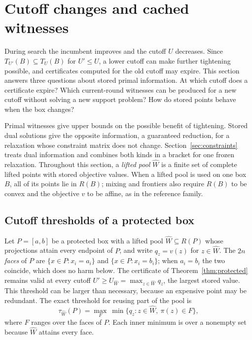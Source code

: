 \section{Cutoff changes and cached witnesses}\label{sec:cutoff}

During search the incumbent improves and the cutoff $U$ decreases. Since
$T_{U'}(B)\subseteq T_U(B)$ for $U'\le U$, a lower cutoff can make
further tightening possible, and certificates computed for the old cutoff
may expire. This section answers three questions about stored primal
information. At which cutoff does a certificate expire? Which
current-round witnesses can be produced for a new cutoff without solving
a new support problem? How do stored points behave when the box changes?

Primal witnesses give upper bounds on the possible benefit of tightening.
Stored dual solutions give the opposite information, a guaranteed
reduction, for a relaxation whose constraint matrix does not change.
Section~\ref{sec:constraints} treats dual information and combines both
kinds in a bracket for one frozen relaxation. Throughout this section, a
\emph{lifted pool} $\widehat W$ is a finite set of complete lifted points
with stored objective values. When a lifted pool is used on one box $B$,
all of its points lie in $R(B)$; mixing and frontiers also require
$R(B)$ to be convex and the objective $v$ to be affine, as in the
reference family.

\subsection{Cutoff thresholds of a protected box}\label{sec:cutoff-thresholds}

Let $P=[a,b]$ be a protected box with a lifted pool
$\widehat W\subseteq R(P)$ whose projections attain every endpoint of
$P$, and write $q_z=v(z)$ for $z\in\widehat W$. The $2n$ \emph{faces} of
$P$ are $\{x\in P:x_i=a_i\}$ and $\{x\in P:x_i=b_i\}$; when $a_i=b_i$ the
two coincide, which does no harm below. The certificate of
Theorem~\ref{thm:protected} remains valid at every cutoff
$U'\ge U_{\widehat W}=\max_{z\in\widehat W}q_z$, the largest stored value.
This threshold can be larger than necessary, because an expensive point
may be redundant. The exact threshold for reusing part of the pool is
\begin{equation}\label{eq:face-threshold}
 \tau_{\widehat W}(P)=\max_F\ \min\{q_z:z\in\widehat W,\ \pi(z)\in F\},
\end{equation}
where $F$ ranges over the faces of $P$. Each inner minimum is over a
nonempty set because $\widehat W$ attains every face.

